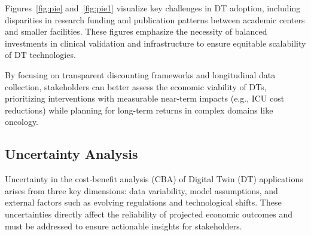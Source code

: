 \documentclass[10pt,a4paper]{article}
\begin{document}
Figures~\ref{fig:pie} and~\ref{fig:pie1} visualize key challenges in DT adoption, including disparities in research funding and publication patterns between academic centers and smaller facilities. These figures emphasize the necessity of balanced investments in clinical validation and infrastructure to ensure equitable scalability of DT technologies.

By focusing on transparent discounting frameworks and longitudinal data collection, stakeholders can better assess the economic viability of DTs, prioritizing interventions with measurable near-term impacts (e.g., ICU cost reductions) while planning for long-term returns in complex domains like oncology.

\subsection*{Uncertainty Analysis}

Uncertainty in the cost-benefit analysis (CBA) of Digital Twin (DT) applications arises from three key dimensions: data variability, model assumptions, and external factors such as evolving regulations and technological shifts. These uncertainties directly affect the reliability of projected economic outcomes and must be addressed to ensure actionable insights for stakeholders.
\end{document}
